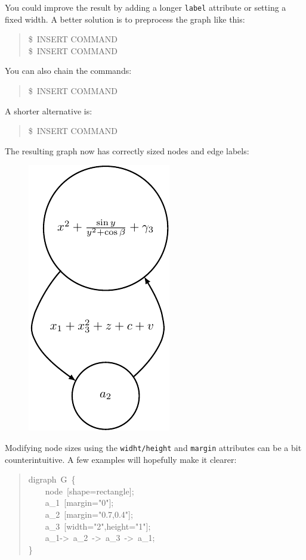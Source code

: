 \documentclass[10pt,a4paper,english]{article}
\begin{document}
You could improve the result by adding a longer \texttt{label} attribute or setting a fixed width. A better solution is to preprocess the graph like this:
\begin{quote}{\ttfamily \raggedright \noindent
{\$}~INSERT COMMAND\\
{\$}~INSERT COMMAND
}\end{quote}

You can also chain the commands:
\begin{quote}{\ttfamily \raggedright \noindent
{\$}~INSERT COMMAND
}\end{quote}

A shorter alternative is:
\begin{quote}{\ttfamily \raggedright \noindent
{\$}~INSERT COMMAND
}\end{quote}

The resulting graph now has correctly sized nodes and edge labels:
\begin{figure}[H]
\centering

\includegraphics{pdf/preproc1b}
\end{figure}

Modifying node sizes using the \texttt{widht/height} and \texttt{margin} attributes can be a bit counterintuitive. A few examples will hopefully make it clearer:
\begin{quote}{\ttfamily \raggedright \noindent
digraph~G~{\{}~\\
~~~~node~{[}shape=rectangle{]};~\\
~~~~a{\_}1~{[}margin="0"{]};~\\
~~~~a{\_}2~{[}margin="0.7,0.4"{]};~\\
~~~~a{\_}3~{[}width="2",height="1"{]};~\\
~~~~a{\_}1->~a{\_}2~->~a{\_}3~->~a{\_}1;~\\
{\}}
}\end{quote}
\end{document}
